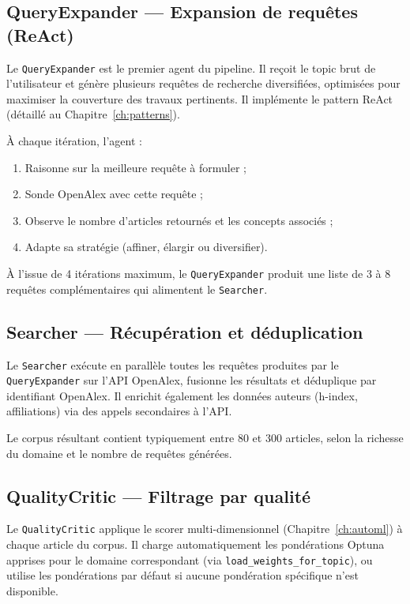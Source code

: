 \subsection{QueryExpander — Expansion de requêtes (ReAct)}

Le \texttt{QueryExpander} est le premier agent du pipeline. Il reçoit
le topic brut de l'utilisateur et génère plusieurs requêtes de recherche
diversifiées, optimisées pour maximiser la couverture des travaux pertinents.
Il implémente le pattern ReAct (détaillé au Chapitre~\ref{ch:patterns}).

À chaque itération, l'agent :
\begin{enumerate}
  \item Raisonne sur la meilleure requête à formuler ;
  \item Sonde OpenAlex avec cette requête ;
  \item Observe le nombre d'articles retournés et les concepts associés ;
  \item Adapte sa stratégie (affiner, élargir ou diversifier).
\end{enumerate}

À l'issue de 4 itérations maximum, le \texttt{QueryExpander} produit
une liste de 3 à 8 requêtes complémentaires qui alimentent le \texttt{Searcher}.

\subsection{Searcher — Récupération et déduplication}

Le \texttt{Searcher} exécute en parallèle toutes les requêtes produites
par le \texttt{QueryExpander} sur l'API OpenAlex, fusionne les résultats
et déduplique par identifiant OpenAlex. Il enrichit également les données
auteurs (h-index, affiliations) via des appels secondaires à l'API.

Le corpus résultant contient typiquement entre 80 et 300 articles, selon
la richesse du domaine et le nombre de requêtes générées.

\subsection{QualityCritic — Filtrage par qualité}

Le \texttt{QualityCritic} applique le scorer multi-dimensionnel
(Chapitre~\ref{ch:automl}) à chaque article du corpus. Il charge
automatiquement les pondérations Optuna apprises pour le domaine correspondant
(via \texttt{load\_weights\_for\_topic}), ou utilise les pondérations par
défaut si aucune pondération spécifique n'est disponible.

